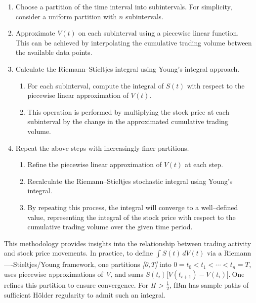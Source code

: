 \documentclass[12pt,a4paper]{report}
\numberwithin{equation}{section}
\begin{document}
\begin{enumerate}
    \item {} Choose a partition of the time interval into subintervals. For simplicity, consider a uniform partition with $n$ subintervals.

    \item {} Approximate $V(t)$ on each subinterval using a piecewise linear function. This can be achieved by interpolating the cumulative trading volume between the available data points.

    \item {} Calculate the Riemann--Stieltjes integral using Young's integral approach.
    \begin{enumerate}
        \item For each subinterval, compute the integral of $S(t)$ with respect to the piecewise linear approximation of $V(t)$.
        \item This operation is performed by multiplying the stock price at each subinterval by the change in the approximated cumulative trading volume.
    \end{enumerate}

    \item {} Repeat the above steps with increasingly finer partitions.
    \begin{enumerate}
        \item Refine the piecewise linear approximation of $V(t)$ at each step.
        \item Recalculate the Riemann--Stieltjes stochastic integral using Young's integral.
        \item By repeating this process, the integral will converge to a well--defined value, representing the integral of the stock price with respect to the cumulative trading volume over the given time period.
    \end{enumerate}
\end{enumerate}

This methodology provides insights into the relationship between trading activity and stock price movements.
In practice, to define \(\int_{}^{}{S(t)}\, dV(t)\) via a
Riemann----Stieltjes/Young framework, one partitions \emph{{[}0,T{]}} into
\(0 = t_{0} < t_{1} < \cdots < t_{n} = T\), uses piecewise
approximations of \emph{V}, and sums
\(S(t_{i})\lbrack V(t_{i + 1}) - V(t_{i})\rbrack.\ \)One refines this
partition to ensure convergence. For \emph{H \textgreater{}
$\frac{1}{2}$}\hspace{0pt}, fBm has sample paths of sufficient Hölder regularity to
admit such an integral.
\end{document}
